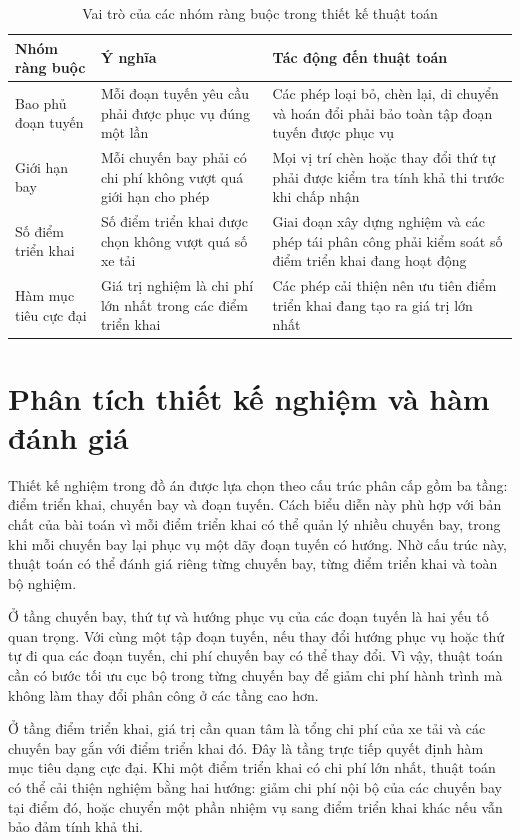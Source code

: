 \begin{table}[H]
\centering
\caption{Vai trò của các nhóm ràng buộc trong thiết kế thuật toán}
\label{tab:chapter4-constraints}
\begin{tabular}{|p{3.6cm}|p{5.0cm}|p{5.0cm}|}
\hline
\textbf{Nhóm ràng buộc} & \textbf{Ý nghĩa} & \textbf{Tác động đến thuật toán} \\
\hline
Bao phủ đoạn tuyến & Mỗi đoạn tuyến yêu cầu phải được phục vụ đúng một lần & Các phép loại bỏ, chèn lại, di chuyển và hoán đổi phải bảo toàn tập đoạn tuyến được phục vụ \\
\hline
Giới hạn bay & Mỗi chuyến bay phải có chi phí không vượt quá giới hạn cho phép & Mọi vị trí chèn hoặc thay đổi thứ tự phải được kiểm tra tính khả thi trước khi chấp nhận \\
\hline
Số điểm triển khai & Số điểm triển khai được chọn không vượt quá số xe tải & Giai đoạn xây dựng nghiệm và các phép tái phân công phải kiểm soát số điểm triển khai đang hoạt động \\
\hline
Hàm mục tiêu cực đại & Giá trị nghiệm là chi phí lớn nhất trong các điểm triển khai & Các phép cải thiện nên ưu tiên điểm triển khai đang tạo ra giá trị lớn nhất \\
\hline
\end{tabular}
\end{table}

\section{Phân tích thiết kế nghiệm và hàm đánh giá}

Thiết kế nghiệm trong đồ án được lựa chọn theo cấu trúc phân cấp gồm ba tầng: điểm triển khai, chuyến bay và đoạn tuyến. Cách biểu diễn này phù hợp với bản chất của bài toán vì mỗi điểm triển khai có thể quản lý nhiều chuyến bay, trong khi mỗi chuyến bay lại phục vụ một dãy đoạn tuyến có hướng. Nhờ cấu trúc này, thuật toán có thể đánh giá riêng từng chuyến bay, từng điểm triển khai và toàn bộ nghiệm.

Ở tầng chuyến bay, thứ tự và hướng phục vụ của các đoạn tuyến là hai yếu tố quan trọng. Với cùng một tập đoạn tuyến, nếu thay đổi hướng phục vụ hoặc thứ tự đi qua các đoạn tuyến, chi phí chuyến bay có thể thay đổi. Vì vậy, thuật toán cần có bước tối ưu cục bộ trong từng chuyến bay để giảm chi phí hành trình mà không làm thay đổi phân công ở các tầng cao hơn.

Ở tầng điểm triển khai, giá trị cần quan tâm là tổng chi phí của xe tải và các chuyến bay gắn với điểm triển khai đó. Đây là tầng trực tiếp quyết định hàm mục tiêu dạng cực đại. Khi một điểm triển khai có chi phí lớn nhất, thuật toán có thể cải thiện nghiệm bằng hai hướng: giảm chi phí nội bộ của các chuyến bay tại điểm đó, hoặc chuyển một phần nhiệm vụ sang điểm triển khai khác nếu vẫn bảo đảm tính khả thi.


